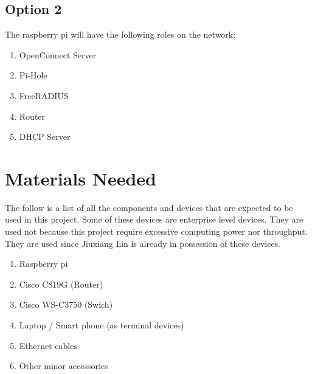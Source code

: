 \documentclass[12pt]{article}
\begin{document}
\subsection{Option 2}

The raspberry pi will have the following roles on the network:

\begin{enumerate}
\item OpenConnect Server
\item Pi-Hole
\item FreeRADIUS
\item Router
\item DHCP Server
\end{enumerate}

\section{Materials Needed}

The follow is a list of all the components and devices that are expected to be used in this project. Some of these devices are enterprise level devices. They are used not because this project require excessive computing power nor throughput. They are used since Jiuxiang Lin is already in possession of these devices.

\begin{enumerate}
\item Raspberry pi
\item Cisco C819G (Router)
\item Cisco WS-C3750 (Swich)
\item Laptop / Smart phone (as terminal devices)
\item Ethernet cables
\item Other minor accessories
\end{enumerate}
\end{document}
